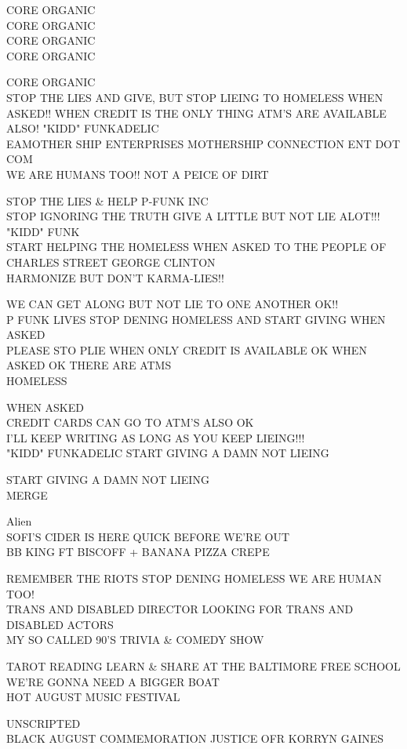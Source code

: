 \documentclass[10pt,letterpaper]{article}
\begin{document}
CORE ORGANIC\\
CORE ORGANIC\\
CORE ORGANIC\\
CORE ORGANIC

CORE ORGANIC\\
STOP THE LIES AND GIVE, BUT STOP LIEING TO HOMELESS WHEN ASKED!! WHEN CREDIT IS THE ONLY THING ATM'S ARE AVAILABLE ALSO! "KIDD" FUNKADELIC\\
EAMOTHER SHIP ENTERPRISES MOTHERSHIP CONNECTION ENT DOT COM\\
WE ARE HUMANS TOO!! NOT A PEICE OF DIRT

STOP THE LIES \& HELP P{-}FUNK INC\\
STOP IGNORING THE TRUTH GIVE A LITTLE BUT NOT LIE ALOT!!! "KIDD" FUNK\\
START HELPING THE HOMELESS WHEN ASKED TO THE PEOPLE OF CHARLES STREET GEORGE CLINTON\\
HARMONIZE BUT DON'T KARMA{-}LIES!!

WE CAN GET ALONG BUT NOT LIE TO ONE ANOTHER OK!!\\
P FUNK LIVES STOP DENING HOMELESS AND START GIVING WHEN ASKED\\
PLEASE STO PLIE WHEN ONLY CREDIT IS AVAILABLE OK WHEN ASKED OK THERE ARE ATMS\\
HOMELESS

WHEN ASKED\\
CREDIT CARDS CAN GO TO ATM'S ALSO OK\\
I'LL KEEP WRITING AS LONG AS YOU KEEP LIEING!!!\\
"KIDD" FUNKADELIC START GIVING A DAMN NOT LIEING

START GIVING A DAMN NOT LIEING\\
MERGE

Alien\\
SOFI'S CIDER IS HERE QUICK BEFORE WE'RE OUT\\
BB KING FT BISCOFF + BANANA PIZZA CREPE

REMEMBER THE RIOTS STOP DENING HOMELESS WE ARE HUMAN TOO!\\
TRANS AND DISABLED DIRECTOR LOOKING FOR TRANS AND DISABLED ACTORS\\
MY SO CALLED 90'S TRIVIA \& COMEDY SHOW

TAROT READING LEARN \& SHARE AT THE BALTIMORE FREE SCHOOL\\
WE'RE GONNA NEED A BIGGER BOAT\\
HOT AUGUST MUSIC FESTIVAL

UNSCRIPTED\\
BLACK AUGUST COMMEMORATION JUSTICE OFR KORRYN GAINES
\end{document}
